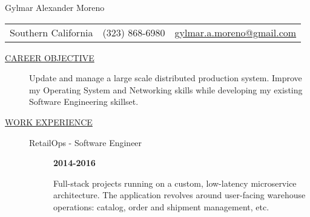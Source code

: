 \documentclass[12pt]{article}
\begin{document}
    \begin{center}
        {\LARGE Gylmar Alexander Moreno}
        \\
        \begin{tabular}{l|l|l}
            Southern California & (323) 868-6980 &
            \href{mailto:gylmar.a.moreno@gmail.com}{gylmar.a.moreno@gmail.com}
        \end{tabular}
    \end{center}

    \begin{description}
        \item[\underline{CAREER OBJECTIVE}] \hfill
            \begin{flushleft}
                Update and manage a large scale distributed production system. Improve my Operating System and Networking skills while developing 
                my existing Software Engineering skillset.
            \end{flushleft}
        \item[\underline{WORK EXPERIENCE}] \hfill
            \begin{description}
                \item[RetailOps - Software Engineer] \hfill \textbf{2014-2016}
                    \begin{flushleft}
                        Full-stack projects running on a custom, low-latency microservice architecture.
                        The application revolves around user-facing warehouse operations: catalog, order and shipment management, etc.
                    \end{flushleft}


\end{description}
\end{description}
\end{document}
